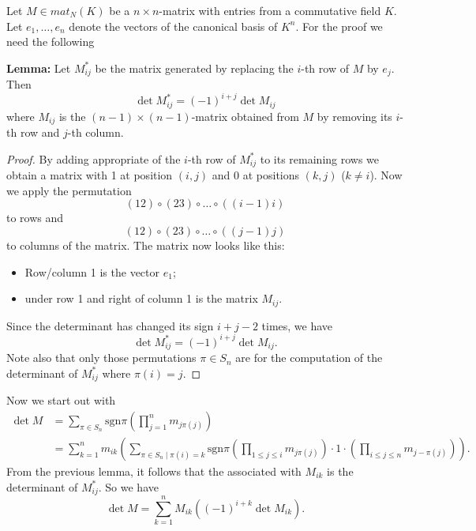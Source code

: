 \documentclass[12pt]{article}
\begin{document}
Let $M \in mat_N(K)$ be a $n \times n$-matrix with entries from a commutative
field $K$. Let $e_1, \ldots, e_n$ denote the vectors of the canonical basis of
$K^n$. For the proof we need the following

\textbf{Lemma:} Let $M_{ij}^*$ be the matrix generated by replacing the $i$-th
row of $M$ by $e_j$. Then
\[\det{M_{ij}^*} =(-1)^{i+j}\det{M_{ij}}\]
where $M_{ij}$ is the $(n -1) \times (n-1)$-matrix obtained from $M$ by removing
its $i$-th row and $j$-th column.

\begin{proof}
By adding appropriate  of the $i$-th row of $M_{ij}^*$
to its remaining rows we obtain a matrix with 1 at position $(i,j)$ and 0 at
positions $(k,j)$ ($k \neq i$). Now we apply the permutation
\[(1 2) \circ (2 3) \circ\dots \circ ((i -1) i)\]
to rows and
\[(1 2) \circ (2 3) \circ\dots \circ ((j-1)j)\]
to columns of the matrix. The matrix now looks like this:
\begin{itemize}
\item
Row/column 1 is the vector $e_1$;
\item
under row 1 and right of column 1 is the matrix $M_{ij}$.
\end{itemize}
Since the determinant has changed its sign $i+j-2$ times, we have
\[\det{M_{ij}^*} =(-1)^{i+j}\det{M_{ij}}.\]
Note also that only those permutations
$\pi \in S_n$ are  for the computation of the determinant of $M_{ij}^*$ where $\pi(i)=j$.
\end{proof}
Now we start out with
\begin{eqnarray*}
\det{M} &=\sum\limits_{\pi \in S_n} \mathrm{sgn} \pi\left(\prod_{j=1}^n
m_{j\pi(j)}\right) \\
&=\sum_{k=1}^n m_{ik}\left(\sum\limits_{\pi \in S_n \mid \pi(i)=k} \mathrm{sgn}
\pi\left(\prod\limits_{1 \le j \le i} m_{j\pi(j)}\right) \cdot 1 \cdot \left(\prod\limits_{i \le j \le n}
m_{j-\pi(j)}\right)\right).
\end{eqnarray*}
From the previous lemma, it follows that the   associated with $M_{ik}$
is the determinant of $M_{ij}^*$. So we have
\[\det{M} =\sum_{k=1}^n M_{ik}\left((-1)^{i+k}\det{M_{ik}}\right).\]
\end{document}
